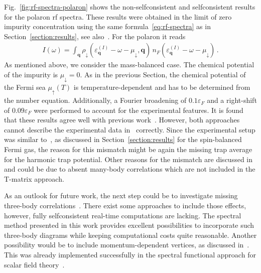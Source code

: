 Fig.~\ref{fig:rf-spectra-polaron} shows the non-selfconsistent and selfconsistent results for the polaron rf spectra. These results were obtained in the limit of zero impurity concentration using the same formula~\eqref{eq:rf-spectra} as in Section~\ref{section:results}, see also~\cite{Hu2022,Tajima2019}. For the polaron it reads
%
\begin{align}
	\label{eq:rf-spectra-polaron}
	I(\omega) = \int_{\bm{q}} \rho_{\downarrow}(\varepsilon^{(I)}_{\bm{q}}-\omega-\mu_{\downarrow},\bm{q})\, n_F(\varepsilon^{(I)}_{\bm{q}}-\omega-\mu_{\downarrow}) \,.
\end{align}
%
As mentioned above, we consider the mass-balanced case. The chemical potential of the impurity is $\mu_{\downarrow}=0$. As in the previous Section, the chemical potential of the Fermi sea $\mu_{\uparrow}(T)$ is temperature-dependent and has to be determined from the number equation. Additionally, a Fourier broadening of $0.1\varepsilon_F$ and a right-shift of $0.09\varepsilon_F$ were performed to account for the experimental features. It is found that these results agree well with previous work~\cite{Hu2022,Tajima2019}. However, both approaches cannot describe the experimental data in~\cite{Yan2019} correctly. Since the experimental setup was similar to~\cite{Mukherjee2019}, as discussed in Section~\ref{section:results} for the spin-balanced Fermi gas, the reason for this mismatch might be again the missing trap average for the harmonic trap potential. Other reasons for the mismatch are discussed in~\cite{Hu2022,Tajima2019} and could be due to absent many-body correlations which are not included in the T-matrix approach.

As an outlook for future work, the next step could be to investigate missing three-body correlations~\cite{Bruun2010,Tajima2019}. There exist some approaches to include those effects, however, fully selfconsistent real-time computations are lacking. The spectral method presented in this work provides excellent possibilities to incorporate such three-body diagrams while keeping computational costs quite reasonable. Another possibility would be to include momentum-dependent vertices, as discussed in~\cite{Diehl2006-1, Floerchinger2008, Falco2007, Romans2005, Romans2006}. This was already implemented successfully in the spectral functional approach for scalar field theory~\cite{Horak2020}.


